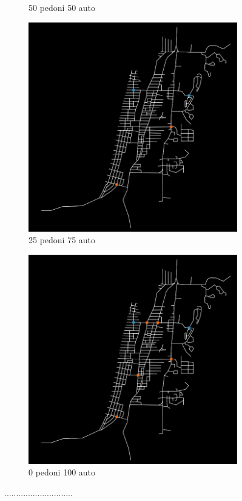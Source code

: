 \begin{figure}[ht]
\begin{subfigure}{0.45\textwidth}
        \caption{50 pedoni 50 auto}
    \end{subfigure}
    \hfill
    \begin{subfigure}{0.45\textwidth}
        \centering
        \includegraphics[width=\textwidth]{images/analisi/comparison-new-in-out-flow-25-75-car.png}
        \caption{25 pedoni 75 auto}
    \end{subfigure}
    \begin{subfigure}{0.45\textwidth}
        \centering
        \includegraphics[width=\textwidth]{images/analisi/comparison-new-in-out-flow-0-100-car.png}
        \caption{0 pedoni 100 auto}
    \end{subfigure}
    \caption{.............................}
    \label{fig:analisi-comparison-in-out-flow-map-new}
\end{figure}


